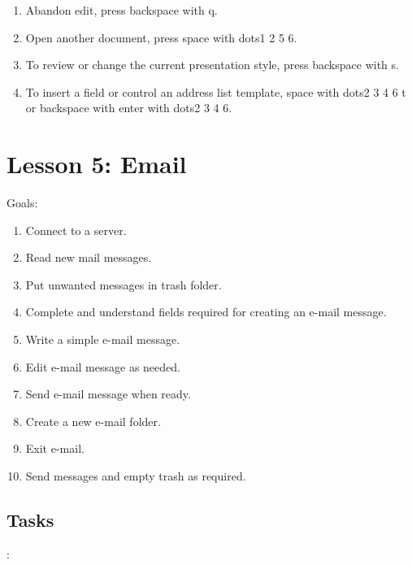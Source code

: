 \documentclass[10pt,letterpaper,twoside]{report}
\begin{document}
{{{{\begin{enumerate}
	\item Abandon edit, press backspace with q.
	      
	\item Open another document, press space with dots1 2 5 6.
	      
	\item To review or change the current presentation style, press backspace with s.
	      
	\item To insert a field or control an address list template, space with dots2 3 4 6 t or backspace with enter with dots2 3 4 6.
\end{enumerate}



\section*{Lesson 5: Email}


Goals:



\begin{enumerate}
	\item Connect to a server.
	      
	\item Read new mail messages.
	      
	\item Put unwanted messages in trash folder.
	      
	\item Complete and understand fields required for creating an e-mail message.
	      
	\item Write a simple e-mail message.
	      
	\item Edit e-mail message as needed.
	      
	\item Send e-mail message when ready.
	      
	\item Create a new e-mail folder.
	      
	\item Exit e-mail.
	      
	\item Send messages and empty trash as required.
\end{enumerate}



 \subsection{Tasks}:



}}}}
\end{document}
